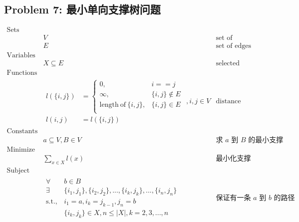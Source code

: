\documentclass[11pt]{article}
\begin{document}
\newpage
\subsection*{Problem 7: 最小单向支撑树问题}

\begin{eqnarray*}
    \textrm{Sets} \\
        & V & \textrm{set of vertices} \\
        & E & \textrm{set of edges} \\
    \textrm{Variables} \\
        & X \subseteq E & \textrm{selected edges} \\
    \textrm{Functions} \\
        & \begin{array}{rl}
            l(\{i, j\}) &= \left\{
                \begin{array}{ll}
                    0,                              & i == j \\
                    \infty,                         & \{i, j\} \notin E \\
                    \mathrm{length\ of\ }\{i, j\},  & \{i, j\} \in E \\
                \end{array}
            \right. \\
            l(i, j) &= l(\{i, j\})
        \end{array}, i, j \in V & \textrm{distance between vertices} \\
    \textrm{Constants} \\
        & a \subseteq V, B \in V & \textrm{求 $a$ 到 $B$ 的最小支撑树} \\
    \textrm{Minimize} \\
        & \displaystyle \sum_{x \in X} l(x) & \textrm{最小化支撑树路径长度} \\
    \textrm{Subject to} \\
        & \begin{array}{rl}
            \forall & b \in B \\
            \exists & \{i_1, j_1\}, \{i_2, j_2\}, ..., \{i_k, j_k\}, ..., \{i_n, j_n\} \\
            \mathrm{s.t.,} & i_1 = a, i_k = j_{k-1}, j_n = b \\
                    & \{i_k, j_k\} \in X, n \leq |X|, k = 2, 3, ..., n
        \end{array} & \textrm{保证有一条 $a$ 到 $b$ 的路径} \\ 
\end{eqnarray*}
\end{document}
